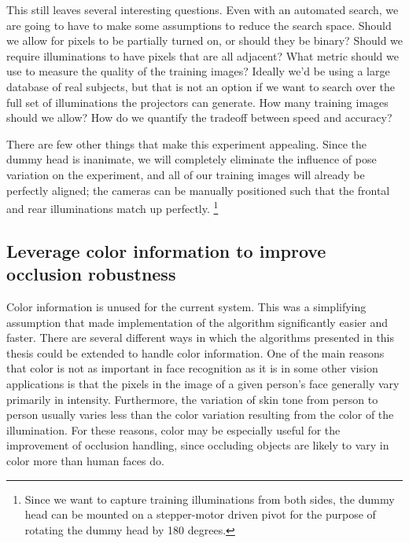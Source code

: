 This still leaves several interesting questions.  Even with an automated search, we are going to have to make some assumptions to reduce the search space.  Should we allow for pixels to be partially turned on, or should they be binary?  Should we require illuminations to have pixels that are all adjacent?  What metric should we use to measure the quality of the training images?  Ideally we'd be using a large database of real subjects, but that is not an option if we want to search over the full set of illuminations the projectors can generate.  How many training images should we allow?  How do we quantify the tradeoff between speed and accuracy?

There are few other things that make this experiment appealing.  Since the dummy head is inanimate, we will completely eliminate the influence of pose variation on the experiment, and all of our training images will already be perfectly aligned; the cameras can be manually positioned such that the frontal and rear illuminations match up perfectly. \footnote{Since we want to capture training illuminations from both sides, the dummy head can be mounted on a stepper-motor driven pivot for the purpose of rotating the dummy head by 180 degrees.  }

\subsection{Leverage color information to improve occlusion robustness}  Color information is unused for the current system.  This was a simplifying assumption that made implementation of the algorithm significantly easier and faster.  There are several different ways in which the algorithms presented in this thesis could be extended to handle color information.  One of the main reasons that color is not as important in face recognition as it is in some other vision applications is that the pixels in the image of a given person's face generally vary primarily in intensity.  Furthermore, the variation of skin tone from person to person usually varies less than the color variation resulting from the color of the illumination.  For these reasons, color may be especially useful for the improvement of occlusion handling, since occluding objects are likely to vary in color more than human faces do.  


